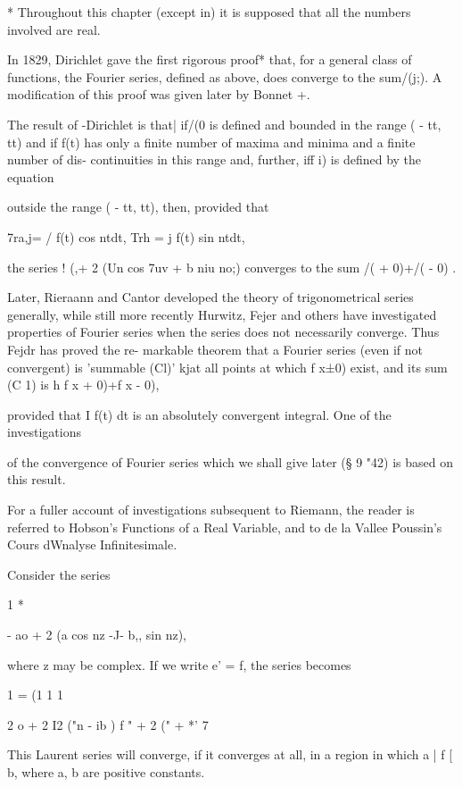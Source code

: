 * Throughout this chapter (except in) it is supposed that all
the numbers involved are real.
%
%

In 1829, Dirichlet gave the first rigorous proof* that, for a general
class of functions, the Fourier series, defined as above, does
converge to the sum/(j;). A modification of this proof was given later
by Bonnet +.

The result of -Dirichlet is that| if/(0 is defined and bounded in the
range ( - tt, tt) and if f(t) has only a finite number of maxima and
minima and a finite number of dis- continuities in this range and,
further, iff i) is defined by the equation

outside the range ( - tt, tt), then, provided that

7ra,j= / f(t) cos ntdt, Trh = j f(t) sin ntdt,

the series ! (,+ 2 (Un cos 7uv + b niu no;) converges to the sum /( +
0)+/( - 0) .

Later, Rieraann and Cantor developed the theory of trigonometrical
series generally, while still more recently Hurwitz, Fejer and others
have investigated properties of Fourier series when the series does
not necessarily converge. Thus Fejdr has proved the re- markable
theorem that a Fourier series (even if not convergent) is 'summable
(Cl)' kjat all points at which f x±0) exist, and its sum (C 1) is h f
x + 0)+f x - 0),

provided that I f(t) dt is an absolutely convergent integral. One of
the investigations

of the convergence of Fourier series which we shall give later (§ 9
"42) is based on this result.

For a fuller account of investigations subsequent to Riemann, the
reader is referred to Hobson's Functions of a Real Variable, and to de
la Vallee Poussin's Cours dWnalyse Infinitesimale.


Consider the series

1 *

- ao + 2 (a cos nz -J- b,, sin nz),

where z may be complex. If we write e' = f, the series becomes

1 = (1 1 1

2 o + 2 I2 ("n - ib ) f " + 2 (" + *' 7

This Laurent series will converge, if it converges at all, in a region
in which a | f [ b, where a, b are positive constants.


